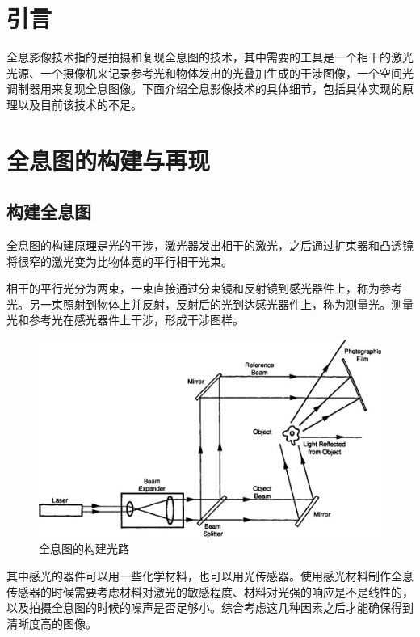 \documentclass{article}
\begin{document}
\begin{multicols}{2}

\section{引言}

全息影像技术指的是拍摄和复现全息图的技术，其中需要的工具是一个相干的激光光源、一个摄像机来记录参考光和物体发出的光叠加生成的干涉图像，一个空间光调制器用来复现全息图像。下面介绍全息影像技术的具体细节，包括具体实现的原理以及目前该技术的不足。

\section{全息图的构建与再现}

\subsection{构建全息图}

全息图的构建原理是光的干涉，激光器发出相干的激光，之后通过扩束器和凸透镜将很窄的激光变为比物体宽的平行相干光束。

相干的平行光分为两束，一束直接通过分束镜和反射镜到感光器件上，称为参考光。另一束照射到物体上并反射，反射后的光到达感光器件上，称为测量光。测量光和参考光在感光器件上干涉，形成干涉图样。

\begin{figure}[H]
  \centering
  \includegraphics[width=0.9\linewidth]{figures/全息图的构建}
  \caption{全息图的构建光路}
\end{figure}

其中感光的器件可以用一些化学材料，也可以用光传感器。使用感光材料制作全息传感器的时候需要考虑材料对激光的敏感程度、材料对光强的响应是不是线性的，以及拍摄全息图的时候的噪声是否足够小。综合考虑这几种因素之后才能确保得到清晰度高的图像。


\end{multicols}
\end{document}
